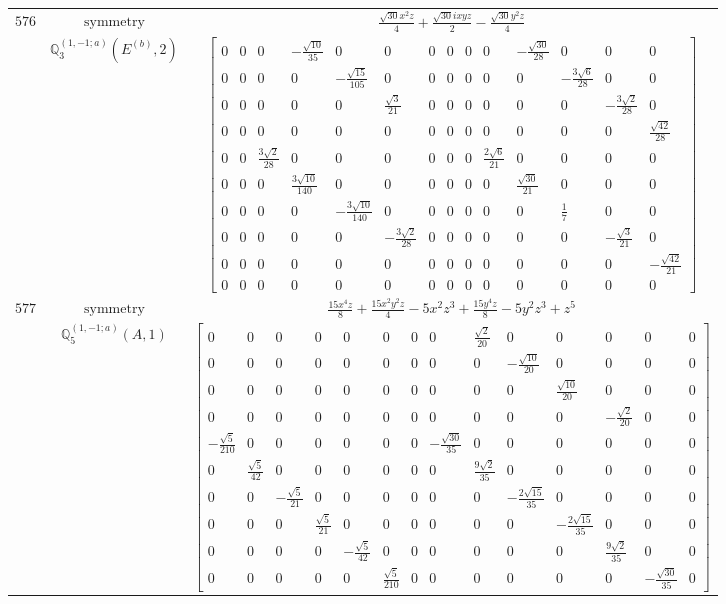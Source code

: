 \documentclass[fleqn,8pt,landscape]{jsarticle}
\begin{document}
\begin{longtable}{ccc}
$ 576 $ & $ \text{symmetry} $ & $ \frac{\sqrt{30} x^{2} z}{4} + \frac{\sqrt{30} i x y z}{2} - \frac{\sqrt{30} y^{2} z}{4} $ \\
$  $ & $ \mathbb{Q}_{3}^{(1,-1;a)}(E^{(b)},2) $ & $ \begin{bmatrix} 0 & 0 & 0 & - \frac{\sqrt{10}}{35} & 0 & 0 & 0 & 0 & 0 & 0 & - \frac{\sqrt{30}}{28} & 0 & 0 & 0 \\ 0 & 0 & 0 & 0 & - \frac{\sqrt{15}}{105} & 0 & 0 & 0 & 0 & 0 & 0 & - \frac{3 \sqrt{6}}{28} & 0 & 0 \\ 0 & 0 & 0 & 0 & 0 & \frac{\sqrt{3}}{21} & 0 & 0 & 0 & 0 & 0 & 0 & - \frac{3 \sqrt{2}}{28} & 0 \\ 0 & 0 & 0 & 0 & 0 & 0 & 0 & 0 & 0 & 0 & 0 & 0 & 0 & \frac{\sqrt{42}}{28} \\ 0 & 0 & \frac{3 \sqrt{2}}{28} & 0 & 0 & 0 & 0 & 0 & 0 & \frac{2 \sqrt{6}}{21} & 0 & 0 & 0 & 0 \\ 0 & 0 & 0 & \frac{3 \sqrt{10}}{140} & 0 & 0 & 0 & 0 & 0 & 0 & \frac{\sqrt{30}}{21} & 0 & 0 & 0 \\ 0 & 0 & 0 & 0 & - \frac{3 \sqrt{10}}{140} & 0 & 0 & 0 & 0 & 0 & 0 & \frac{1}{7} & 0 & 0 \\ 0 & 0 & 0 & 0 & 0 & - \frac{3 \sqrt{2}}{28} & 0 & 0 & 0 & 0 & 0 & 0 & - \frac{\sqrt{3}}{21} & 0 \\ 0 & 0 & 0 & 0 & 0 & 0 & 0 & 0 & 0 & 0 & 0 & 0 & 0 & - \frac{\sqrt{42}}{21} \\ 0 & 0 & 0 & 0 & 0 & 0 & 0 & 0 & 0 & 0 & 0 & 0 & 0 & 0 \end{bmatrix} $ \\ \hline
$ 577 $ & $ \text{symmetry} $ & $ \frac{15 x^{4} z}{8} + \frac{15 x^{2} y^{2} z}{4} - 5 x^{2} z^{3} + \frac{15 y^{4} z}{8} - 5 y^{2} z^{3} + z^{5} $ \\
$  $ & $ \mathbb{Q}_{5}^{(1,-1;a)}(A,1) $ & $ \begin{bmatrix} 0 & 0 & 0 & 0 & 0 & 0 & 0 & 0 & \frac{\sqrt{2}}{20} & 0 & 0 & 0 & 0 & 0 \\ 0 & 0 & 0 & 0 & 0 & 0 & 0 & 0 & 0 & - \frac{\sqrt{10}}{20} & 0 & 0 & 0 & 0 \\ 0 & 0 & 0 & 0 & 0 & 0 & 0 & 0 & 0 & 0 & \frac{\sqrt{10}}{20} & 0 & 0 & 0 \\ 0 & 0 & 0 & 0 & 0 & 0 & 0 & 0 & 0 & 0 & 0 & - \frac{\sqrt{2}}{20} & 0 & 0 \\ - \frac{\sqrt{5}}{210} & 0 & 0 & 0 & 0 & 0 & 0 & - \frac{\sqrt{30}}{35} & 0 & 0 & 0 & 0 & 0 & 0 \\ 0 & \frac{\sqrt{5}}{42} & 0 & 0 & 0 & 0 & 0 & 0 & \frac{9 \sqrt{2}}{35} & 0 & 0 & 0 & 0 & 0 \\ 0 & 0 & - \frac{\sqrt{5}}{21} & 0 & 0 & 0 & 0 & 0 & 0 & - \frac{2 \sqrt{15}}{35} & 0 & 0 & 0 & 0 \\ 0 & 0 & 0 & \frac{\sqrt{5}}{21} & 0 & 0 & 0 & 0 & 0 & 0 & - \frac{2 \sqrt{15}}{35} & 0 & 0 & 0 \\ 0 & 0 & 0 & 0 & - \frac{\sqrt{5}}{42} & 0 & 0 & 0 & 0 & 0 & 0 & \frac{9 \sqrt{2}}{35} & 0 & 0 \\ 0 & 0 & 0 & 0 & 0 & \frac{\sqrt{5}}{210} & 0 & 0 & 0 & 0 & 0 & 0 & - \frac{\sqrt{30}}{35} & 0 \end{bmatrix} $ \\ \hline

\end{longtable}
\end{document}
